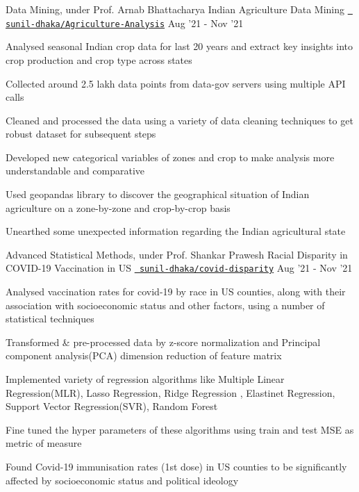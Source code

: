 \begin{cventries}
  \cventry
  {Data Mining, under Prof. Arnab Bhattacharya}
  {Indian Agriculture Data Mining}
  {\texttt{\href{https://github.com/sunil-dhaka/Agriculture-Analysis-on-Indian-States}{\faGithub{} sunil-dhaka/Agriculture-Analysis}}}
  {Aug '21 - Nov '21}
  {
    \begin{cvitems}
    \item Analysed seasonal Indian crop data for last 20 years and extract key insights into crop production and crop type across states
    \item Collected around 2.5 lakh data points from data-gov servers using multiple API calls
    \item Cleaned and processed the data using a variety of data cleaning techniques to get robust dataset for subsequent steps
    \item Developed new categorical variables of zones and crop to make analysis more understandable and comparative  
    \item Used geopandas library to discover the geographical situation of Indian agriculture on a zone-by-zone and crop-by-crop basis
    \item Unearthed some unexpected information regarding the Indian agricultural state
    \end{cvitems}
  }
  
  \cventry
  {Advanced Statistical Methods, under Prof. Shankar Prawesh}
  {Racial Disparity in COVID-19 Vaccination in US}
  {\texttt{\href{https://github.com/sunil-dhaka/ime692-project}{\faGithub{} sunil-dhaka/covid-disparity}}}
  {Aug '21 - Nov '21}
  {
    \begin{cvitems}
    \item Analysed vaccination rates for covid-19 by race in US counties, along with their association with socioeconomic status and other factors, using a number of statistical techniques
    \item Transformed \& pre-processed data by z-score normalization and Principal component analysis(PCA) dimension reduction of feature matrix
    \item Implemented variety of regression algorithms like Multiple Linear Regression(MLR), Lasso Regression, Ridge Regression , Elastinet Regression, Support Vector Regression(SVR), Random Forest
    \item Fine tuned the hyper parameters of these algorithms using train and test MSE as metric of measure
    \item Found Covid-19 immunisation rates (1st dose) in US counties to be significantly affected by socioeconomic status and political ideology
    \end{cvitems}
  }


\end{cventries}
